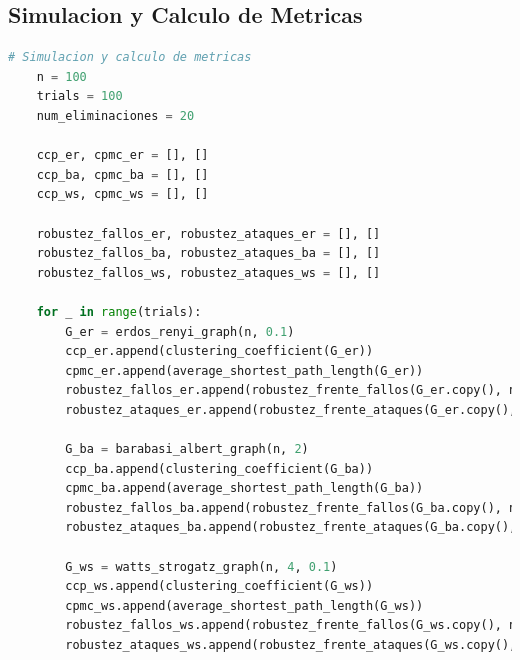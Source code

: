 \subsection{Simulacion y Calculo de Metricas}

\begin{lstlisting}[language=Python]
    # Simulacion y calculo de metricas
    n = 100
    trials = 100
    num_eliminaciones = 20
    
    ccp_er, cpmc_er = [], []
    ccp_ba, cpmc_ba = [], []
    ccp_ws, cpmc_ws = [], []
    
    robustez_fallos_er, robustez_ataques_er = [], []
    robustez_fallos_ba, robustez_ataques_ba = [], []
    robustez_fallos_ws, robustez_ataques_ws = [], []
    
    for _ in range(trials):
        G_er = erdos_renyi_graph(n, 0.1)
        ccp_er.append(clustering_coefficient(G_er))
        cpmc_er.append(average_shortest_path_length(G_er))
        robustez_fallos_er.append(robustez_frente_fallos(G_er.copy(), num_eliminaciones))
        robustez_ataques_er.append(robustez_frente_ataques(G_er.copy(), num_eliminaciones))
        
        G_ba = barabasi_albert_graph(n, 2)
        ccp_ba.append(clustering_coefficient(G_ba))
        cpmc_ba.append(average_shortest_path_length(G_ba))
        robustez_fallos_ba.append(robustez_frente_fallos(G_ba.copy(), num_eliminaciones))
        robustez_ataques_ba.append(robustez_frente_ataques(G_ba.copy(), num_eliminaciones))
        
        G_ws = watts_strogatz_graph(n, 4, 0.1)
        ccp_ws.append(clustering_coefficient(G_ws))
        cpmc_ws.append(average_shortest_path_length(G_ws))
        robustez_fallos_ws.append(robustez_frente_fallos(G_ws.copy(), num_eliminaciones))
        robustez_ataques_ws.append(robustez_frente_ataques(G_ws.copy(), num_eliminaciones))
\end{lstlisting}